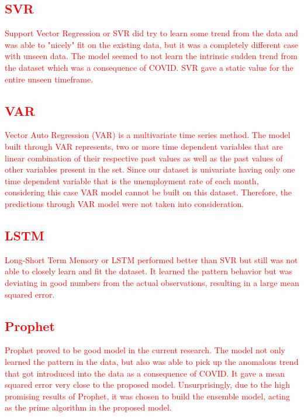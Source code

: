 \documentclass[times,twocolumn,final,authoryear]{elsarticle}
\begin{document}
	\subsection{\textcolor{red}{SVR}}
	\textcolor{red}{Support Vector Regression or SVR did try to learn some trend from the data and was able to "nicely" fit on the existing data, but it was a completely different case with unseen data. The model seemed to not learn the intrinsic sudden trend from the dataset which was a consequence of COVID. SVR gave a static value for the entire unseen timeframe.}


	\subsection{\textcolor{red}{VAR}}
	\textcolor{red}{Vector Auto Regression (VAR) is a multivariate time series method. The model built through VAR represents, two or more time dependent variables that are linear combination of their respective past values as well as the past values of other variables present in the set.
	Since our dataset is univariate having only one time dependent variable that is the unemployment rate of each month, considering this case VAR model cannot be built on this dataset. Therefore, the predictions through VAR model were not taken into consideration.}
	
	\subsection{\textcolor{red}{LSTM}}
	\textcolor{red}{Long-Short Term Memory or LSTM performed better than SVR but still was not able to closely learn and fit the dataset. It learned the pattern behavior but was deviating in good numbers from the actual observations, resulting in a large mean squared error. }
	

	\subsection{\textcolor{red}{Prophet}}
	\textcolor{red}{Prophet proved to be good model in the current research. The model not only learned the pattern in the data, but also was able to  pick up the anomalous trend that got introduced into the data as a consequence of COVID. It gave a mean squared error very close to the proposed model. Unsurprisingly, due to the high promising results of Prophet, it was chosen to build the ensemble model, acting as the prime algorithm in the proposed model.}
	
\end{document}
